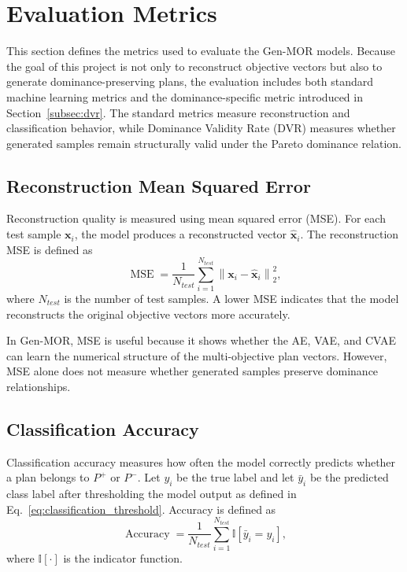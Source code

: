 \section{Evaluation Metrics}
\label{sec:evaluation_metrics}

This section defines the metrics used to evaluate the Gen-MOR models. Because the goal of this project is not only to reconstruct objective vectors but also to generate dominance-preserving plans, the evaluation includes both standard machine learning metrics and the dominance-specific metric introduced in Section~\ref{subsec:dvr}. The standard metrics measure reconstruction and classification behavior, while Dominance Validity Rate (DVR) measures whether generated samples remain structurally valid under the Pareto dominance relation.

\subsection{Reconstruction Mean Squared Error}
\label{subsec:metric_mse}

Reconstruction quality is measured using mean squared error (MSE). For each test sample $\mathbf{x}_i$, the model produces a reconstructed vector $\hat{\mathbf{x}}_i$. The reconstruction MSE is defined as
\begin{equation}
    \operatorname{MSE}
    =
    \frac{1}{N_{test}}
    \sum_{i=1}^{N_{test}}
    \left\|
        \mathbf{x}_i - \hat{\mathbf{x}}_i
    \right\|_2^2,
    \label{eq:metric_mse}
\end{equation}
where $N_{test}$ is the number of test samples. A lower MSE indicates that the model reconstructs the original objective vectors more accurately.

In Gen-MOR, MSE is useful because it shows whether the AE, VAE, and CVAE can learn the numerical structure of the multi-objective plan vectors. However, MSE alone does not measure whether generated samples preserve dominance relationships.

\subsection{Classification Accuracy}
\label{subsec:metric_accuracy}

Classification accuracy measures how often the model correctly predicts whether a plan belongs to $P^{+}$ or $P^{-}$. Let $y_i$ be the true label and let $\bar{y}_i$ be the predicted class label after thresholding the model output as defined in Eq.~\eqref{eq:classification_threshold}. Accuracy is defined as
\begin{equation}
    \operatorname{Accuracy}
    =
    \frac{1}{N_{test}}
    \sum_{i=1}^{N_{test}}
    \mathbb{I}
    \left[
        \bar{y}_i = y_i
    \right],
    \label{eq:metric_accuracy}
\end{equation}
where $\mathbb{I}[\cdot]$ is the indicator function.

